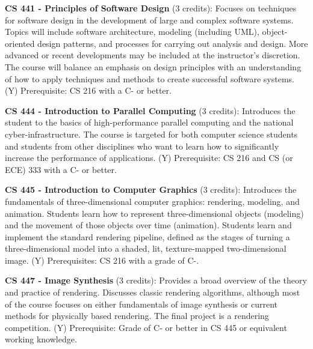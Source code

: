 \documentclass[12pt,twoside]{article}
\begin{document}
{\bf\noindent CS 441 - Principles of Software Design} (3 credits):
Focuses on techniques for software design in the development of large
and complex software systems. Topics will include software
architecture, modeling (including UML), object-oriented design
patterns, and processes for carrying out analysis and design. More
advanced or recent developments may be included at the instructor's
discretion. The course will balance an emphasis on design principles
with an understanding of how to apply techniques and methods to create
successful software systems.  (Y) Prerequisite: CS 216 with a C- or
better.

{\bf\noindent CS 444 - Introduction to Parallel Computing} (3
credits): Introduces the student to the basics of high-performance
parallel computing and the national cyber-infrastructure. The course
is targeted for both computer science students and students from other
disciplines who want to learn how to significantly increase the
performance of applications.  (Y) Prerequisite: CS 216 and CS (or ECE)
333 with a C- or better.

{\bf\noindent CS 445 - Introduction to Computer Graphics} (3 credits):
Introduces the fundamentals of three-dimensional computer graphics:
rendering, modeling, and animation. Students learn how to represent
three-dimensional objects (modeling) and the movement of those objects
over time (animation). Students learn and implement the standard
rendering pipeline, defined as the stages of turning a
three-dimensional model into a shaded, lit, texture-mapped
two-dimensional image. (Y) Prerequisites: CS 216 with a grade of C-.

     
{\bf\noindent CS 447 - Image Synthesis} (3 credits): Provides a broad
overview of the theory and practice of rendering. Discusses classic
rendering algorithms, although most of the course focuses on either
fundamentals of image synthesis or current methods for physically
based rendering. The final project is a rendering competition. (Y)
Prerequisite: Grade of C- or better in CS 445 or equivalent working
knowledge.
\end{document}
